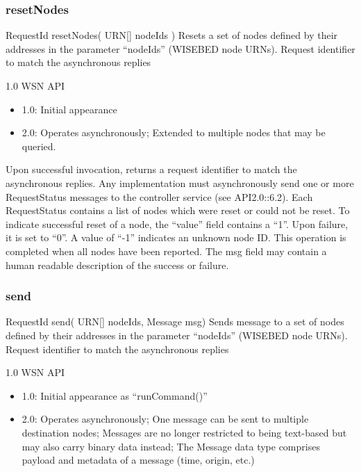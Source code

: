 			\subsubsection{resetNodes}

\begin{apidoc}
	{RequestId resetNodes( URN[] nodeIds )} %
	{Resets a set of nodes defined by their addresses in the parameter ``nodeIds'' (WISEBED node URNs). } %
	{
	} %
	{Request identifier to match the asynchronous replies} %
	{ } %
	{1.0 WSN API
		\begin{itemize}
			\item 1.0: Initial appearance
			\item 2.0: Operates asynchronously; Extended to multiple nodes that may be queried.
		\end{itemize}
	} %
\end{apidoc}

Upon successful invocation, returns a request identifier to match the asynchronous replies. Any implementation must asynchronously send one or more RequestStatus messages to the controller service (see API2.0::6.2). Each RequestStatus contains a list of nodes which were reset or could not be reset. To indicate successful reset of a node, the ``value'' field contains a ``1''. Upon failure, it is set to ``0''. A value of ``-1'' indicates an unknown node ID. This operation is completed when all nodes have been reported. The msg field may contain a human readable description of the success or failure.

			\subsubsection{send}

\begin{apidoc}
	{RequestId send( URN[] nodeIds, Message msg)} %
	{Sends message to a set of nodes defined by their addresses in the parameter ``nodeIds'' (WISEBED node URNs).} %
	{
	} %
	{Request identifier to match the asynchronous replies} %
	{ } %
	{1.0 WSN API
		\begin{itemize}
			\item 1.0: Initial appearance as ``runCommand()''
			\item 2.0: Operates asynchronously; One message can be sent to multiple destination nodes; Messages are no longer restricted to being text-based but may also carry binary data instead; The Message data type comprises payload and metadata of a message (time, origin, etc.)
		\end{itemize}
	} %
\end{apidoc}

